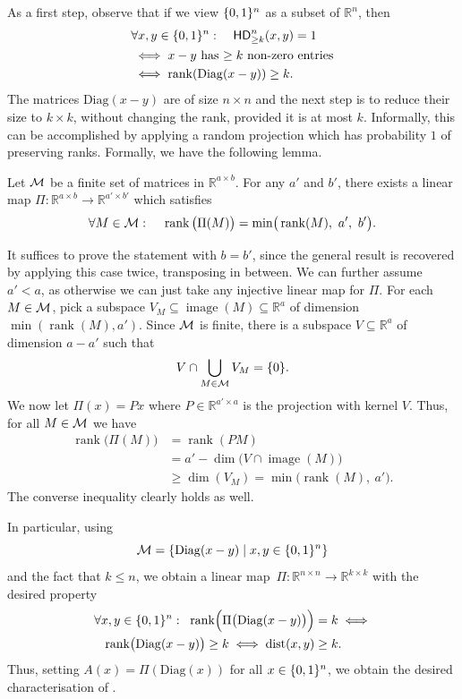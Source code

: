 \documentclass[conference]{IEEEtran}
\DeclareMathOperator{\img}{image}
\newcommand{\Diag}{\mathrm{Diag}}
\DeclareMathOperator{\rank}{rank}
\newcommand{\HD}[1]{\mathsf{HD}_{#1}}
\newcommand{\R}{\mathbb{R}}
\begin{document}
As a first step, observe that if we view $\{0,1\}^n$ as a subset of $\R^n$, then
\begin{align}\label{eq:first-step}
&\forall x,y\in\{0,1\}^n\,\colon\quad \HD{\geq k}^n(x,y) = 1\\
&\iff x-y \text{ has $\geq k$ non-zero entries}\notag\\
&\iff \rank(\Diag(x-y)) \geq k.\notag
\end{align}
The matrices $\Diag(x-y)$ are of size $n \times n$ and the next step is to reduce their size to $k\times k$, without changing the rank, provided it is at most $k$.
Informally, this can be accomplished by applying a random projection which has
probability $1$ of preserving ranks. Formally, we have the following lemma.
\begin{lemma}
    \label{lemma:rank-compression}
    Let $\mathcal{M}$ be a finite set of matrices in $\R^{a\times b}$. For any $a'$ and $b'$, there exists a linear map $\Pi\colon \R^{a\times b}\to\R^{a'\times b'}$ which satisfies
    \[
    \forall M\in \cM\,\colon\quad \rank\big(\Pi(M)\big) = \min\!\big(\rank(M),\ a',\ b'\big).
    \]
\end{lemma}
\begin{IEEEproof}
It suffices to prove the statement with $b = b'$, since the general result is
recovered by applying this case twice, transposing in between. We can further
assume $a' < a$, as otherwise we can just take any injective linear map for
$\Pi$. For each $M\in\mathcal{M}$, pick a subspace $V_M\subseteq \img(M)\subseteq \R^a$
of dimension $\min(\rank(M), a')$. Since $\mathcal{M}$ is finite, there is a subspace
$V\subseteq\R^a$ of dimension $a-a'$ such that
\[
V\cap \bigcup_{M\in\mathcal{M}} V_M = \{0\}.
\]
We now let $\Pi(x) = Px$ where $P\in\R^{a'\times a}$ is the projection with kernel $V$. Thus, for all $M\in\mathcal{M}$ we have
\begin{align*}
\rank\big(\Pi(M)\big) &= \rank(PM)\\
&= a' - \dim\!\big(V \cap \img(M)\big)\\
&\geq \dim(V_M) = \min\!\big(\rank(M),\ a'\big).
\end{align*}
The converse inequality clearly holds as well.
\end{IEEEproof}
In particular, using
$$\cM = \{\Diag(x-y)\mid x,y\in \zo^n\}$$
and the fact that
$k\leq n$, we obtain a linear map~$\Pi\colon\R^{n\times n}\to
\R^{k\times k}$ with the desired property
\begin{align}\label{eq:khd-rank-problem}
\forall x,y\in \{0,1\}^n\,\colon\ \rank\!\Big(\Pi\big(\Diag(x-y)\big)\Big) &= k\iff\notag\\
\rank\!\big(\Diag(x-y)\big) \geq k\iff \dist(x,y) &\geq k.
\end{align}
Thus, setting $A(x) = \Pi(\Diag(x))$ for all $x\in\{0,1\}^n$, we obtain the desired characterisation of .
\end{document}

